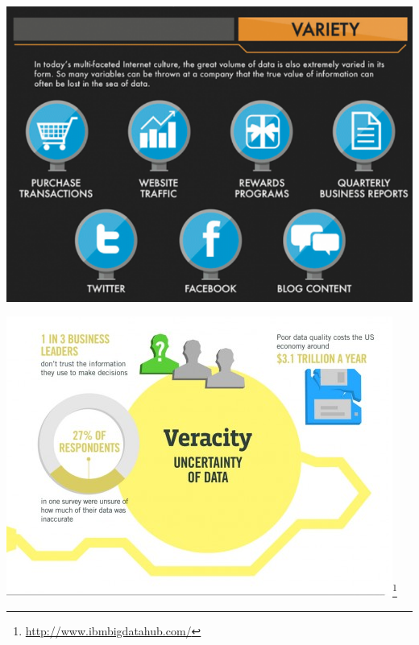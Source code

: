 \documentclass{beamer}
\begin{document}
\begin{frame}{}
    \begin{center}
        \includegraphics[scale=0.4]{bigDataVariety.png}
    \end{center}
\end{frame}
\begin{frame}{}
    \begin{center}
        \includegraphics[scale=0.5]{bigDataVeracity.png}\footnote{\url{http://www.ibmbigdatahub.com/}}
    \end{center}
\end{frame}
\end{document}
